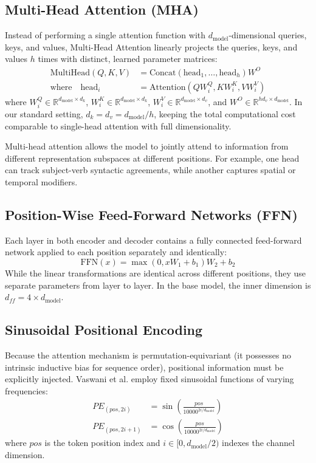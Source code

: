 \documentclass[conference]{IEEEtran}
\begin{document}
\subsection{Multi-Head Attention (MHA)}
Instead of performing a single attention function with $d_{\text{model}}$-dimensional queries, keys, and values, Multi-Head Attention linearly projects the queries, keys, and values $h$ times with distinct, learned parameter matrices:
\begin{align}
\text{MultiHead}(Q, K, V) &= \text{Concat}(\text{head}_1, \dots, \text{head}_h) W^O \\
\text{where} \quad \text{head}_i &= \text{Attention}(Q W_i^Q, K W_i^K, V W_i^V)
\end{align}
where $W_i^Q \in \mathbb{R}^{d_{\text{model}} \times d_k}$, $W_i^K \in \mathbb{R}^{d_{\text{model}} \times d_k}$, $W_i^V \in \mathbb{R}^{d_{\text{model}} \times d_v}$, and $W^O \in \mathbb{R}^{h d_v \times d_{\text{model}}}$. In our standard setting, $d_k = d_v = d_{\text{model}} / h$, keeping the total computational cost comparable to single-head attention with full dimensionality.

Multi-head attention allows the model to jointly attend to information from different representation subspaces at different positions. For example, one head can track subject-verb syntactic agreements, while another captures spatial or temporal modifiers.

\subsection{Position-Wise Feed-Forward Networks (FFN)}
Each layer in both encoder and decoder contains a fully connected feed-forward network applied to each position separately and identically:
\begin{equation}
\text{FFN}(x) = \max(0, x W_1 + b_1) W_2 + b_2
\label{eq:ffn}
\end{equation}
While the linear transformations are identical across different positions, they use separate parameters from layer to layer. In the base model, the inner dimension is $d_{ff} = 4 \times d_{\text{model}}$.

\subsection{Sinusoidal Positional Encoding}
Because the attention mechanism is permutation-equivariant (it possesses no intrinsic inductive bias for sequence order), positional information must be explicitly injected. Vaswani et al. employ fixed sinusoidal functions of varying frequencies:
\begin{align}
PE_{(pos, 2i)}   &= \sin\left(\frac{pos}{10000^{2i / d_{\text{model}}}}\right) \\
PE_{(pos, 2i+1)} &= \cos\left(\frac{pos}{10000^{2i / d_{\text{model}}}}\right)
\label{eq:pe}
\end{align}
where $pos$ is the token position index and $i \in [0, d_{\text{model}}/2)$ indexes the channel dimension. 
\end{document}
